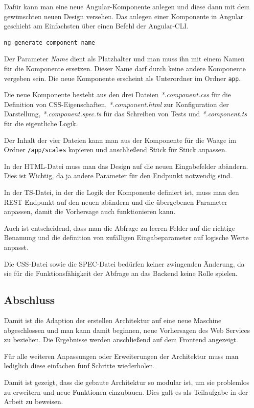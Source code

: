 Dafür kann man eine neue Angular-Komponente anlegen und diese dann mit dem gewünschten neuen Design versehen. Das
anlegen einer Komponente in Angular geschieht am Einfachsten über einen Befehl der Angular-CLI.

\begin{lstlisting}[caption=Erstellen einer neuen Komponente, label=ls:schlauchbeutelmaschine_component]
    ng generate component name
\end{lstlisting}

Der Parameter \textit{Name} dient als Platzhalter und man muss ihn mit einem Namen für die Komponente ersetzen. Dieser
Name darf durch keine andere Komponente vergeben sein. Die neue Komponente erscheint als Unterordner im Ordner
\texttt{app}.

Die neue Komponente besteht aus den drei Dateien \textit{*.component.css} für die Definition von CSS-Eigenschaften,
\textit{*.component.html} zur Konfiguration der Darstellung, \textit{*.component.spec.ts} für das Schreiben von Tests
und \textit{*.component.ts} für die eigentliche Logik.

Der Inhalt der vier Dateien kann man aus der Komponente für die Waage im Ordner \texttt{/app/scales} kopieren und
anschließend Stück für Stück anpassen.

In der HTML-Datei muss man das Design auf die neuen Eingabefelder abändern. Dies ist Wichtig, da ja andere Parameter für
den Endpunkt notwendig sind.

In der TS-Datei, in der die Logik der Komponente definiert ist, muss man den REST-Endpunkt auf den neuen abändern und
die übergebenen Parameter anpassen, damit die Vorhersage auch funktionieren kann.

Auch ist entscheidend, dass man die Abfrage zu leeren Felder auf die richtige Benamung und die definition von
zufälligen Eingabeparameter auf logische Werte anpasst.

Die CSS-Datei sowie die SPEC-Datei bedürfen keiner zwingenden Änderung, da sie für die Funktionsfähigkeit der Abfrage an
das Backend keine Rolle spielen.

\subsection{Abschluss}
Damit ist die Adaption der erstellen Architektur auf eine neue Maschine abgeschlossen und man kann damit beginnen,
neue Vorhersagen des Web Services zu beziehen. Die Ergebnisse werden anschließend auf dem Frontend angezeigt.

Für alle weiteren Anpassungen oder Erweiterungen der Architektur muss man lediglich diese einfachen fünf Schritte
wiederholen.

Damit ist gezeigt, dass die gebaute Architektur so modular ist, um sie problemlos zu erweitern und neue Funktionen
einzubauen. Dies galt es als Teilaufgabe in der Arbeit zu beweisen.
